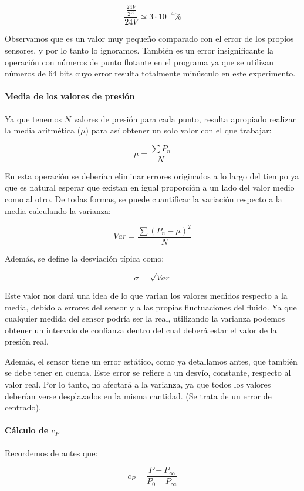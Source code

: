 \documentclass{article}
\begin{document}
$$\frac{\frac{24V}{2^{18}}}{24V} \simeq 3 \cdot 10^{-4}\%$$

Observamos que es un valor muy pequeño comparado con el error de los propios sensores, y por lo tanto lo ignoramos. También
es un error insignificante la operación con números de punto flotante en el programa ya que se utilizan números de 64 bits 
cuyo error resulta totalmente minúsculo en este experimento.


\paragraph{Media de los valores de presión}

Ya que tenemos $N$ valores de presión para cada punto, resulta apropiado realizar la media aritmética ($\mu$) para así obtener 
un solo valor con el que trabajar:

$$\mu = \frac{\sum P_n}{N}$$

En esta operación se deberían eliminar errores originados a lo largo del tiempo ya que 
es natural esperar que existan en igual proporción a un lado del valor medio como al otro. De todas formas, se puede cuantificar 
la variación respecto a la media calculando la varianza:

$$Var = \frac{\sum (P_n - \mu)^2}{N}$$

Además, se define la desviación típica como:

$$\sigma = \sqrt{Var}$$

Este valor nos dará una idea de lo que varian los valores medidos respecto a la media, debido a errores del sensor y a 
las propias fluctuaciones del fluido. Ya que cualquier medida del sensor podría ser la real, utilizando la varianza podemos 
obtener un intervalo de confianza dentro del cual deberá estar el valor de la presión real.

Además, el sensor tiene un error estático, como ya detallamos antes, que también se debe tener en cuenta. Este error se refiere
a un desvío, constante, respecto al valor real. Por lo tanto, no afectará a la varianza, ya que todos los valores deberían verse 
desplazados en la misma cantidad. (Se trata de un error de centrado).

\paragraph{Cálculo de $c_P$}

Recordemos de antes que:

$$c_P = \frac{P - P_{\infty}}{P_0 - P_{\infty}}$$
\end{document}
